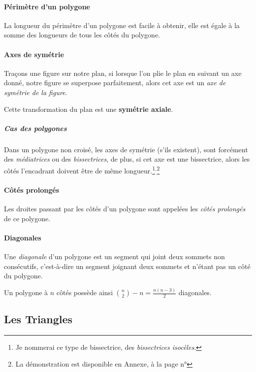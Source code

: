 \documentclass[a4paper, twoside]{article}
\begin{document}
\medbreak

\paragraph*{Périmètre d'un polygone}

La longueur du périmètre d'un polygone est facile à obtenir,
elle est égale à la somme des longueurs de tous les côtés du polygone.

\paragraph*{Axes de symétrie}

Traçons une figure sur notre plan,
si lorsque l'on plie le plan en suivant un axe donné,
notre figure se superpose parfaitement,
alors cet axe est un \emph{axe de symétrie de la figure}.

Cette transformation du plan est une \textbf{symétrie axiale}.

\subparagraph*{Cas des polygones}

Dans un polygone non croisé, les axes de symétrie (s'ils existent),
sont forcément des \emph{médiatrices} ou des \emph{bissectrices}, de plus,
si cet axe est une bissectrice, alors les côtés l'encadrant doivent être de même
longueur.\footnote{
	Je nommerai ce type de bissectrice, des \emph{bissectrices isocèles}.
}$^\text{,}$\footnote{
	La démonstration est disponible en Annexe, à la page n°\pageref*{demo_axes_symétrie_polygone}
}

\paragraph*{Côtés prolongés}

Les droites passant par les côtés d'un polygone sont appelées
les \emph{côtés prolongés} de ce polygone.


\paragraph*{Diagonales}

Une \emph{diagonale} d'un polygone est un segment qui joint deux sommets non consécutifs,
c'est-à-dire un segment joignant deux sommets et n'étant pas un côté du polygone.

Un polygone à $n$ côtés possède ainsi $\binom{n}{2} - n = \frac{n(n-3)}{2}$ diagonales.

\newpage

\subsection{Les Triangles} \label{triangles}
\end{document}

